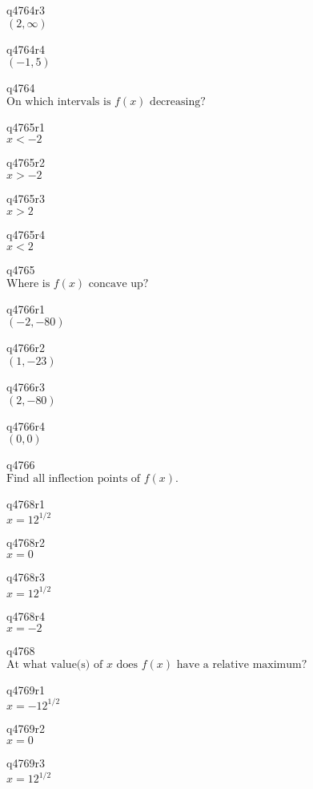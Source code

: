 q4764r3\\
\(\displaystyle (2, \infty) \)

q4764r4\\
\(\displaystyle (-1, 5) \)

q4764\\
\(\displaystyle \text{On which intervals is } f(x) \text{ decreasing?} \)

q4765r1\\
\(\displaystyle x < -2 \)

q4765r2\\
\(\displaystyle x > -2 \)

q4765r3\\
\(\displaystyle x > 2 \)

q4765r4\\
\(\displaystyle x < 2 \)

q4765\\
\(\displaystyle \text{Where is } f(x) \text{ concave up?} \)

q4766r1\\
\(\displaystyle (-2, -80) \)

q4766r2\\
\(\displaystyle (1, -23) \)

q4766r3\\
\(\displaystyle (2, -80) \)

q4766r4\\
\(\displaystyle (0,0) \)

q4766\\
\(\displaystyle \text{Find all inflection points of } f(x). \)

q4768r1\\
\(\displaystyle x = 12^{1/2} \)

q4768r2\\
\(\displaystyle x = 0 \)

q4768r3\\
\(\displaystyle x = 12^{1/2} \)

q4768r4\\
\(\displaystyle x = -2 \)

q4768\\
\(\displaystyle \text{At what value(s) of } x \text{ does } f(x) \text{ have a relative maximum?} \)

q4769r1\\
\(\displaystyle x = -12^{1/2} \)

q4769r2\\
\(\displaystyle x = 0 \)

q4769r3\\
\(\displaystyle x = 12^{1/2} \)

